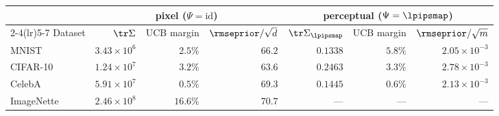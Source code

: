 \begin{tabular}{l r r r r r r}
\toprule
& \multicolumn{3}{c}{pixel ($\Psi=\mathrm{id}$)} & \multicolumn{3}{c}{perceptual ($\Psi=\lpipsmap$)} \\
\cmidrule(lr){2-4}\cmidrule(lr){5-7}
Dataset & $\tr\Sigma$ & UCB margin & $\rmseprior/\sqrt d$ & $\tr\Sigma_{\lpipsmap}$ & UCB margin & $\rmseprior/\sqrt m$ \\
\midrule
MNIST & $3.43\times10^{6}$ & $2.5\%$ & $66.2$ & $0.1338$ & $5.8\%$ & $2.05\times10^{-3}$ \\
CIFAR-10 & $1.24\times10^{7}$ & $3.2\%$ & $63.6$ & $0.2463$ & $3.3\%$ & $2.78\times10^{-3}$ \\
CelebA & $5.91\times10^{7}$ & $0.5\%$ & $69.3$ & $0.1445$ & $0.6\%$ & $2.13\times10^{-3}$ \\
ImageNette & $2.46\times10^{8}$ & $16.6\%$ & $70.7$ & --- & --- & --- \\
\bottomrule
\end{tabular}
